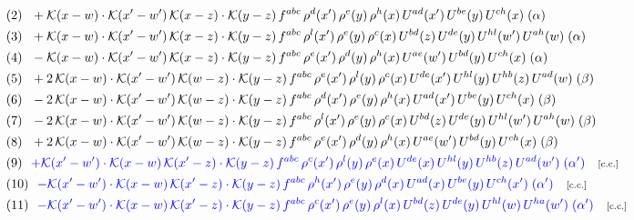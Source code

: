 \documentclass[9pt]{article}
\begin{document}
\begin{align}
&\quad\text{(2)}\ \ +\mathcal{K}(x-w)\cdot \mathcal{K}(x'-w')\, \mathcal{K}(x-z)\cdot \mathcal{K}(y-z)\, f^{abc}\, \rho^{d}(x')\,\rho^{e}(y)\,\rho^{h}(x)\,U^{ad}(x')\,U^{be}(y)\,U^{ch}(x)\;(\alpha)\notag\\
&\quad\text{(3)}\ \ + \mathcal{K}(x-w)\cdot \mathcal{K}(x'-w')\, \mathcal{K}(x-z)\cdot \mathcal{K}(y-z)\, f^{abc}\, \rho^{l}(x')\,\rho^{e}(y)\,\rho^{c}(x)\,U^{bd}(z)\,U^{de}(y)\,U^{hl}(w')\,U^{ah}(w)\;(\alpha)\notag\\
&\quad\text{(4)}\ \ -\mathcal{K}(x-w)\cdot \mathcal{K}(x'-w')\, \mathcal{K}(x-z)\cdot \mathcal{K}(y-z)\, f^{abc}\, \rho^{e}(x')\,\rho^{d}(y)\,\rho^{h}(x)\,U^{ae}(w')\,U^{bd}(y)\,U^{ch}(x)\;(\alpha)\notag\\
&\quad\text{(5)}\ \ +2\, \mathcal{K}(x-w)\cdot \mathcal{K}(x'-w')\, \mathcal{K}(w-z) \cdot \mathcal{K}(y-z)\, f^{abc}\, \rho^{e}(x')\,\rho^{l}(y)\, \rho^{c}(x)\, U^{de}(x')\,U^{hl}(y)\,U^{hb}(z)\,U^{ad}(w)\;(\beta)\notag\\
&\quad\text{(6)}\ \ -2\, \mathcal{K}(x-w)\cdot \mathcal{K}(x'-w')\, \mathcal{K}(w-z) \cdot \mathcal{K}(y-z)\, f^{abc}\, \rho^{d}(x')\,\rho^{e}(y)\, \rho^{h}(x)\, U^{ad}(x')\,U^{be}(y)\,U^{ch}(x)\;(\beta)\notag\\
&\quad\text{(7)}\ \ -2\, \mathcal{K}(x-w)\cdot \mathcal{K}(x'-w')\, \mathcal{K}(w-z) \cdot \mathcal{K}(y-z)\, f^{abc}\, \rho^{l}(x')\,\rho^{e}(y)\, \rho^{c}(x)\, U^{bd}(z)\,U^{de}(y)\,U^{hl}(w')\,U^{ah}(w)\;(\beta)\notag\\
&\quad\text{(8)}\ \ + 2\, \mathcal{K}(x-w)\cdot \mathcal{K}(x'-w')\, \mathcal{K}(w-z) \cdot \mathcal{K}(y-z)\, f^{abc}\, \rho^{e}(x')\,\rho^{d}(y)\, \rho^{h}(x)\, U^{ae}(w')\,U^{bd}(y)\,U^{ch}(x)\;(\beta)\notag\\
&\quad\text{(9)}\ \ \textcolor{blue}{+\mathcal{K}(x'-w')\cdot\mathcal{K}(x-w)\,\mathcal{K}(x'-z)\cdot\mathcal{K}(y-z)\, f^{abc}\,\rho^{c}(x')\,\rho^{l}(y)\,\rho^{e}(x)\,U^{de}(x)\,U^{hl}(y)\,U^{hb}(z)\,U^{ad}(w')\;(\alpha')}\quad\text{\scriptsize[c.c.]}\notag\\
&\quad\text{(10)}\ \ \textcolor{blue}{-\mathcal{K}(x'-w')\cdot\mathcal{K}(x-w)\,\mathcal{K}(x'-z)\cdot\mathcal{K}(y-z)\, f^{abc}\,\rho^{h}(x')\,\rho^{e}(y)\,\rho^{d}(x)\,U^{ad}(x)\,U^{be}(y)\,U^{ch}(x')\;(\alpha')}\quad\text{\scriptsize[c.c.]}\notag\\
&\quad\text{(11)}\ \ \textcolor{blue}{-\mathcal{K}(x'-w')\cdot\mathcal{K}(x-w)\,\mathcal{K}(x'-z)\cdot\mathcal{K}(y-z)\, f^{abc}\,\rho^{c}(x')\,\rho^{e}(y)\,\rho^{l}(x)\,U^{bd}(z)\,U^{de}(y)\,U^{hl}(w)\,U^{ha}(w')\;(\alpha')}\quad\text{\scriptsize[c.c.]}\notag\\

\end{align}
\end{document}
